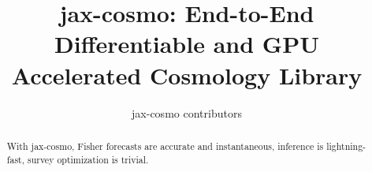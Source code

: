 \documentclass[final,5p,times,twocolumn,authoryear]{elsarticle}
\newcommand{\github}{\href{https://github.com/DifferentiableUniverseInitiative/jax\_cosmo}{\faGithub}}
\begin{document}
\begin{frontmatter}



\title{jax-cosmo: End-to-End Differentiable and GPU Accelerated Cosmology Library}


\author{jax-cosmo contributors}

\address{}

\begin{abstract}
With jax-cosmo, Fisher forecasts are accurate and instantaneous, inference is lightning-fast, survey optimization is trivial. \github
\end{abstract}



\begin{keyword}



\end{keyword}

\end{frontmatter}
\end{document}
